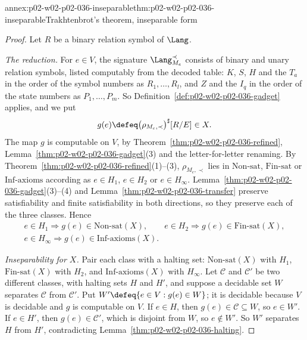 \begin{annexitem}{annex:p02-w02-p02-036-inseparable}{thm:p02-w02-p02-036-inseparable}{Trakhtenbrot's theorem, inseparable form}
\begin{proof}
Let \(R\) be a binary relation symbol of \(\Lang\).

\emph{The reduction.}  For \(e\in V\), the signature \(\Lang_{M_e}^{\prec}\)
consists of binary and unary relation symbols, listed computably from the
decoded table: \(K\), \(S\), \(H\) and the \(T_a\) in the order of the symbol
numbers as \(R_1,\ldots,R_l\), and \(Z\) and the \(I_q\) in the order of the
state numbers as \(P_1,\ldots,P_m\).  So
Definition~\ref{def:p02-w02-p02-036-gadget} applies, and we put
\[
 g(e)\defeq\bigl(\rho_{M_e,\prec}\bigr)^{\sharp}[R/E]\in X.
\]
The map \(g\) is computable on \(V\), by
Theorem~\ref{thm:p02-w02-p02-036-refined},
Lemma~\ref{thm:p02-w02-p02-036-gadget}(3) and the letter-for-letter renaming.
By Theorem~\ref{thm:p02-w02-p02-036-refined}(1)--(3), \(\rho_{M_e,\prec}\) lies
in \(\mathrm{Non\text{-}sat}\), \(\mathrm{Fin\text{-}sat}\) or
\(\mathrm{Inf\text{-}axioms}\) according as \(e\in H_1\), \(e\in H_2\) or
\(e\in H_\infty\).  Lemma~\ref{thm:p02-w02-p02-036-gadget}(3)--(4) and
Lemma~\ref{thm:p02-w02-p02-036-transfer} preserve satisfiability and finite
satisfiability in both directions, so they preserve each of the three
classes.  Hence
\[
\begin{gathered}
 e\in H_1\Rightarrow g(e)\in\mathrm{Non\text{-}sat}(X),\qquad
 e\in H_2\Rightarrow g(e)\in\mathrm{Fin\text{-}sat}(X),\\
 e\in H_\infty\Rightarrow g(e)\in\mathrm{Inf\text{-}axioms}(X).
\end{gathered}
\]

\emph{Inseparability for \(X\).}  Pair each class with a halting set:
\(\mathrm{Non\text{-}sat}(X)\) with \(H_1\), \(\mathrm{Fin\text{-}sat}(X)\)
with \(H_2\), and \(\mathrm{Inf\text{-}axioms}(X)\) with \(H_\infty\).  Let
\(\mathcal C\) and \(\mathcal C'\) be two different classes, with halting sets
\(H\) and \(H'\), and suppose a decidable set \(W\) separates \(\mathcal C\)
from \(\mathcal C'\).  Put \(W'\defeq\{e\in V:g(e)\in W\}\); it is decidable
because \(V\) is decidable and \(g\) is computable on \(V\).  If \(e\in H\),
then \(g(e)\in\mathcal C\subseteq W\), so \(e\in W'\).  If \(e\in H'\), then
\(g(e)\in\mathcal C'\), which is disjoint from \(W\), so \(e\notin W'\).  So
\(W'\) separates \(H\) from \(H'\), contradicting
Lemma~\ref{thm:p02-w02-p02-036-halting}.


\end{proof}
\end{annexitem}
